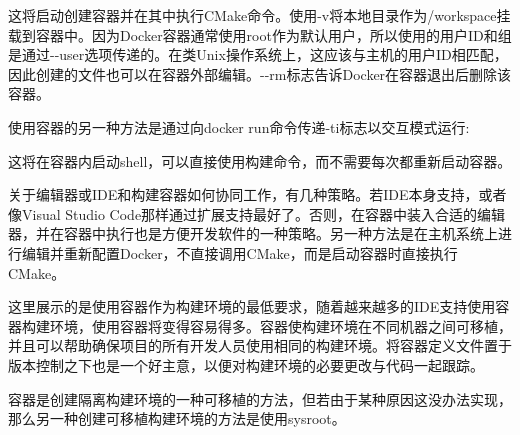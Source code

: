 这将启动创建容器并在其中执行CMake命令。使用-v将本地目录作为/workspace挂载到容器中。因为Docker容器通常使用root作为默认用户，所以使用的用户ID和组是通过-{}-user选项传递的。在类Unix操作系统上，这应该与主机的用户ID相匹配，因此创建的文件也可以在容器外部编辑。-{}-rm标志告诉Docker在容器退出后删除该容器。

使用容器的另一种方法是通过向docker run命令传递-ti标志以交互模式运行:


这将在容器内启动shell，可以直接使用构建命令，而不需要每次都重新启动容器。

关于编辑器或IDE和构建容器如何协同工作，有几种策略。若IDE本身支持，或者像Visual Studio Code那样通过扩展支持最好了。否则，在容器中装入合适的编辑器，并在容器中执行也是方便开发软件的一种策略。另一种方法是在主机系统上进行编辑并重新配置Docker，不直接调用CMake，而是启动容器时直接执行CMake。

这里展示的是使用容器作为构建环境的最低要求，随着越来越多的IDE支持使用容器构建环境，使用容器将变得容易得多。容器使构建环境在不同机器之间可移植，并且可以帮助确保项目的所有开发人员使用相同的构建环境。将容器定义文件置于版本控制之下也是一个好主意，以便对构建环境的必要更改与代码一起跟踪。

容器是创建隔离构建环境的一种可移植的方法，但若由于某种原因这没办法实现，那么另一种创建可移植构建环境的方法是使用sysroot。



















